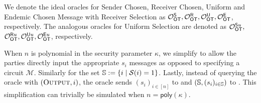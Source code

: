 \begin{definition}
We denote the ideal oracles for Sender Chosen, Receiver Chosen, Uniform and Endemic Chosen Message with Receiver Selection as $\mathcal{O}_{\mathsf{OT}}^\mathsf{S}, \mathcal{O}_{\mathsf{OT}}^\mathsf{R},\mathcal{O}_{\mathsf{OT}}^\mathsf{U},\mathcal{O}_{\mathsf{OT}}^\mathsf{E}$, respectively. The analogous oracles for Uniform Selection are denoted as  $\mathcal{O}_{\mathsf{OT}}^{\mathsf{S} u},$ $\mathcal{O}_{\mathsf{OT}}^{\mathsf{R} u}, \mathcal{O}_{\mathsf{OT}}^{\mathsf{U} u}, \mathcal{O}_{\mathsf{OT}}^{\mathsf{E} u}$, respectively.
\end{definition}
\begin{remark}
	When $n$ is polynomial in the security parameter $\kappa$, we simplify  to allow the parties directly input the appropriate $s_i$ messages as opposed to specifying a circuit $\mathcal{M}$. Similarly for the set $\mathsf{\mathbb S}:=\{i \mid \mathcal{S}(i)=1\}$. Lastly, instead of querying the oracle with $(\textsc{Output}, i)$, the oracle sends $(s_i)_{i\in [n]}$ to \send and $(\mathsf{\mathbb S}, (s_i)_{i\in\mathsf{\mathbb S}})$ to \rec. This simplification can trivially be simulated when $n=\textsf{poly}(\kappa)$.
\end{remark}




